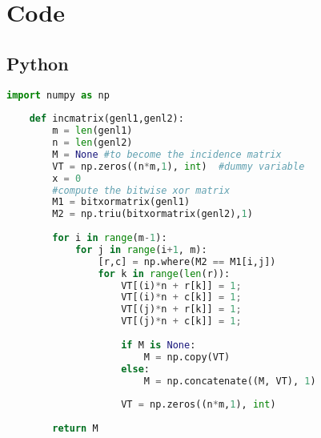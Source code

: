 \section{Code}

  \subsection{Python}

  \begin{lstlisting}[language=Python]
    import numpy as np
        
    def incmatrix(genl1,genl2):
        m = len(genl1)
        n = len(genl2)
        M = None #to become the incidence matrix
        VT = np.zeros((n*m,1), int)  #dummy variable
        x = 0
        #compute the bitwise xor matrix
        M1 = bitxormatrix(genl1)
        M2 = np.triu(bitxormatrix(genl2),1) 
    
        for i in range(m-1):
            for j in range(i+1, m):
                [r,c] = np.where(M2 == M1[i,j])
                for k in range(len(r)):
                    VT[(i)*n + r[k]] = 1;
                    VT[(i)*n + c[k]] = 1;
                    VT[(j)*n + r[k]] = 1;
                    VT[(j)*n + c[k]] = 1;
                    
                    if M is None:
                        M = np.copy(VT)
                    else:
                        M = np.concatenate((M, VT), 1)
                    
                    VT = np.zeros((n*m,1), int)
        
        return M
    \end{lstlisting}

\newpage

